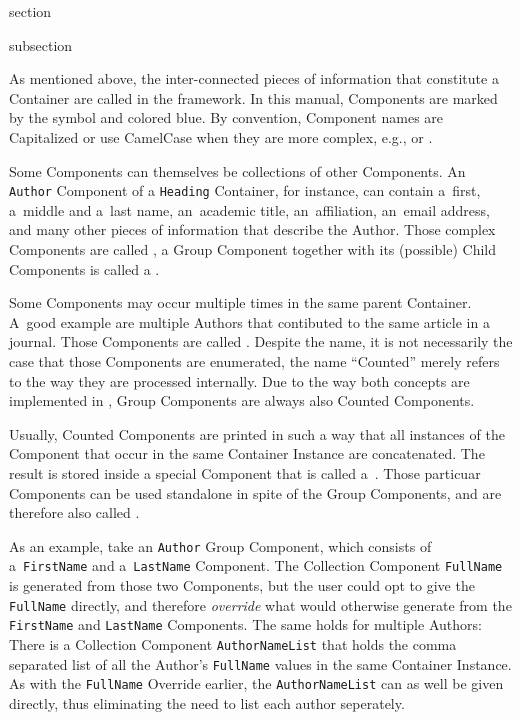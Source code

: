 \begin{Heading}{section}
\end{Heading}


\begin{Heading}{subsection}
\end{Heading}

As mentioned above, the inter-connected pieces of information that
constitute a Container are called  in
the {\CoCoTeX} framework. In this manual, Components are marked by the
symbol {\ComponentSymbol} and colored blue. By convention, Component
names are Capitalized or use CamelCase when they are more complex,
e.g.,  or .

Some Components can themselves be collections of other Components. An
\texttt{Author} Component of a \texttt{Heading} Container, for
instance, can contain a~first, a~middle and a~last name, an~academic
title, an~affiliation, an~email address, and many other pieces of
information that describe the Author. Those complex Components are
called , a Group Component together with
its (possible) Child Components is called a .

Some Components may occur multiple times in the same parent
Container. A~good example are multiple Authors that contibuted to the
same article in a journal. Those Components are called
.  Despite the name,
it is not necessarily the case that those Components are enumerated,
the name “Counted” merely refers to the way they are processed
internally. Due to the way both concepts are implemented in
{\CoCoTeX}, Group Components are always also Counted Components.

Usually, Counted Components are printed in such a way that all
instances of the Component that occur in the same Container Instance
are concatenated.  The result is stored inside a special Component
that is called a~. Those particuar
Components can be used standalone in spite of the Group Components,
and are therefore also called .

As an example, take an \texttt{Author} Group Component, which consists
of a~\texttt{FirstName} and a~\texttt{LastName} Component. The
Collection Component \texttt{FullName} is generated from those two
Components, but the user could opt to give the \texttt{FullName}
directly, and therefore \textit{override} what {\CoCoTeX} would
otherwise generate from the \texttt{FirstName} and \texttt{LastName}
Components. The same holds for multiple Authors: There is a Collection
Component \texttt{AuthorNameList} that holds the comma separated list
of all the Author's \texttt{FullName} values in the same Container
Instance. As with the \texttt{FullName} Override earlier, the
\texttt{AuthorNameList} can as well be given directly, thus
eliminating the need to list each author seperately.

